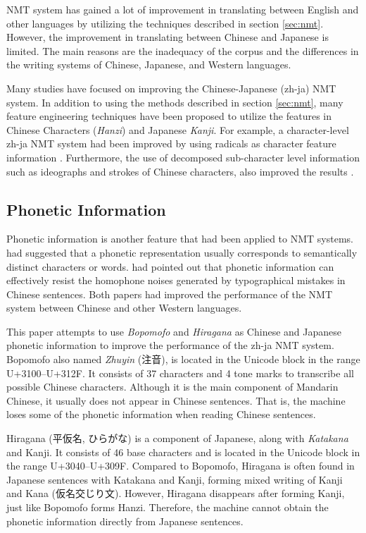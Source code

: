 NMT system has gained a lot of improvement in translating between English and other languages by utilizing the techniques described in section \ref{sec:nmt}. However, the improvement in translating between Chinese and Japanese is limited. The main reasons are the inadequacy of the corpus and the differences in the writing systems of Chinese, Japanese, and Western languages.

Many studies have focused on improving the Chinese-Japanese (zh-ja) NMT system. In addition to using the methods \cite{imamura2018enhancement, chu2017empirical, zhang2020parallel} described in section \ref{sec:nmt}, many feature engineering techniques have been proposed to utilize the features in Chinese Characters (\textit{Hanzi}) and Japanese \textit{Kanji}. For example, a character-level zh-ja NMT system had been improved by using radicals as character feature information \cite{8300572}. Furthermore, the use of decomposed sub-character level information such as ideographs and strokes of Chinese characters, also improved the results \cite{zhang-komachi-2018-neural}.

\subsection{Phonetic Information} \label{sec:phonetic}

Phonetic information is another feature that had been applied to NMT systems. \cite{khan2019diversity} had suggested that a phonetic representation usually corresponds to semantically distinct characters or words. \cite{liu-etal-2019-robust} had pointed out that phonetic information can effectively resist the homophone noises generated by typographical mistakes in Chinese sentences. Both papers had improved the performance of the NMT system between Chinese and other Western languages.

This paper attempts to use \textit{Bopomofo} and \textit{Hiragana} as Chinese and Japanese phonetic information to improve the performance of the zh-ja NMT system. Bopomofo also named \textit{Zhuyin} (注音), is located in the Unicode block in the range U+3100–U+312F. It consists of 37 characters and 4 tone marks to transcribe all possible Chinese characters. Although it is the main component of Mandarin Chinese, it usually does not appear in Chinese sentences. That is, the machine loses some of the phonetic information when reading Chinese sentences. \begin{CJK}{UTF8}{song}
Hiragana (平仮名, ひらがな) is a component of Japanese, along with \textit{Katakana} and Kanji. It consists of 46 base characters and is located in the Unicode block in the range U+3040–U+309F. Compared to Bopomofo, Hiragana is often found in Japanese sentences with Katakana and Kanji, forming mixed writing of Kanji and Kana (仮名交じり文). However, Hiragana disappears after forming Kanji, just like Bopomofo forms Hanzi. Therefore, the machine cannot obtain the phonetic information directly from Japanese sentences.
\end{CJK}


